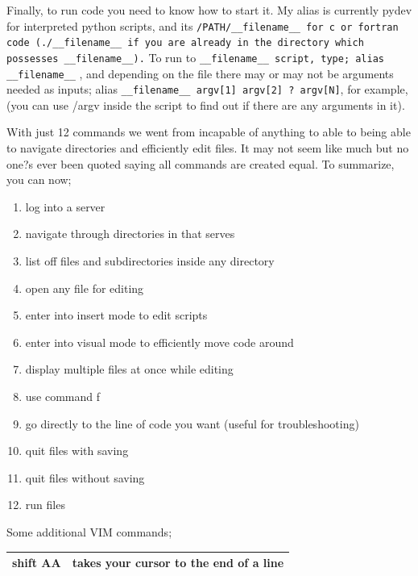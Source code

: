 \documentclass{article}
\newcounter{subsubsubsection}[subsubsection]
\begin{document}
Finally, to run code you need to know how to start it. My alias is currently pydev for interpreted python scripts, and its \texttt{/PATH/\_\_filename\_\_ for c or fortran code (./\_\_filename\_\_ if you are already in the directory which possesses \_\_filename\_\_).} To run to \texttt{\_\_filename\_\_ script, type;
alias \_\_filename\_\_} ,
and depending on the file there may or may not be arguments needed as inputs;
alias \texttt{\_\_filename\_\_ argv[1] argv[2] ? argv[N]},
for example, (you can use /argv inside the script to find out if there are any arguments in it).

With just 12 commands we went from incapable of anything to able to being able to navigate directories and efficiently edit files. It may not seem like much but no one?s ever been quoted saying all commands are created equal. To summarize, you can now;

\begin{enumerate}
   \item log into a server
   \item navigate through directories in that serves
   \item list off files and subdirectories inside any directory
   \item open any file for editing
   \item enter into insert mode to edit scripts 
   \item enter into visual mode to efficiently move code around 
   \item display multiple files at once while editing
   \item use command f 
   \item go directly to the line of code you want (useful for troubleshooting)
   \item quit files with saving
   \item quit files without saving 
   \item run files
\end{enumerate}



Some additional VIM commands; 

\begin{center}
\begin{tabular*}{\textwidth}{ | p{} | p{}| }
\hline
\textbf{shift AA} & takes your cursor to the end of a line \\
\hline
\end{tabular*}
\end{center}
\end{document}
